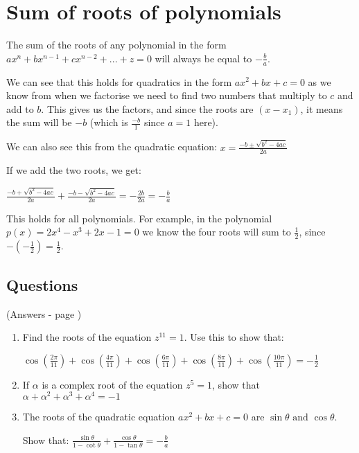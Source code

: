 \documentclass[../main.tex]{subfiles}
\begin{document}
\section{Sum of roots of polynomials}
The sum of the roots of any polynomial in the form \(ax^n+bx^{n-1}+cx^{n-2}+...+z=0\) will always be equal to \(-\frac{b}{a}\).

We can see that this holds for quadratics in the form \(ax^2+bx+c=0\) as we know from when we factorise we need to find two numbers that multiply to \(c\) and add to \(b\). This gives us the factors, and since the roots are \((x-x_1)\), it means the sum will be \(-b\) (which is \(\frac{-b}{1}\) since \(a=1\) here).

We can also see this from the quadratic equation:
\(x=\frac{-b\pm\sqrt{b^2-4ac}}{2a}\)

If we add the two roots, we get:

\(\frac{-b+\sqrt{b^2-4ac}}{2a}+\frac{-b-\sqrt{b^2-4ac}}{2a}=-\frac{2b}{2a}=-\frac{b}{a}\)

This holds for all polynomials. For example, in the polynomial \(p(x)=2x^4-x^3+2x-1=0\) we know the four roots will sum to \(\frac{1}{2}\), since \(-(-\frac{1}{2})=\frac{1}{2}\).

\pagebreak

\subsection*{Questions}
(Answers - page {\pageref*{Sum of roots answers}})
\label{Sum of roots}
\begin{enumerate}
    \item Find the roots of the equation \(z^{11}=1\). Use this to show that:
    
    \(\cos{(\frac{2\pi}{11})}+\cos{(\frac{4\pi}{11})+\cos{(\frac{6\pi}{11})+\cos{(\frac{8\pi}{11})+\cos{(\frac{10\pi}{11})=-\frac{1}{2}}}}}\)

    \item If \(\alpha\) is a complex root of the equation \(z^5=1 \), show that \(\alpha+\alpha^2+\alpha^3+\alpha^4=-1\)
    
    \item The roots of the quadratic equation \(ax^2+bx+c=0\) are \(\sin{\theta}\text{ and } \cos{\theta}\).
    
    Show that: \(\frac{\sin{\theta}}{1-\cot{\theta}}+\frac{\cos{\theta}}{1-\tan{\theta}}=-\frac{b}{a}\)
\end{enumerate}
\end{document}

